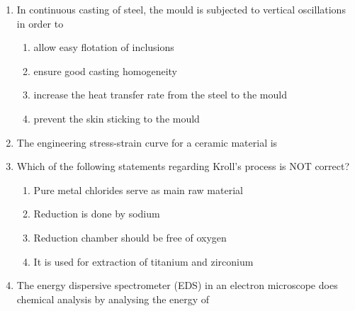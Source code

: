 \documentclass[journal,12pt,onecolumn]{IEEEtran}
\theoremstyle{remark}
\begin{document}
\begin{enumerate}
    

    \item In continuous casting of steel, the mould is subjected to vertical oscillations in order to
    \hfill{}
    \begin{enumerate}[label=(\Alph*)]
        \item allow easy flotation of inclusions
        \item ensure good casting homogeneity
        \item increase the heat transfer rate from the steel to the mould
        \item prevent the skin sticking to the mould
    \end{enumerate}
    


    \item The engineering stress-strain curve for a ceramic material is
    \hfill{}
    \begin{enumerate}[label=(\Alph*)]
    \end{enumerate}
    
    \item Which of the following statements regarding Kroll's process is NOT correct?
    \hfill{}
    \begin{enumerate}[label=(\Alph*)]
        \item Pure metal chlorides serve as main raw material
        \item Reduction is done by sodium
        \item Reduction chamber should be free of oxygen
        \item It is used for extraction of titanium and zirconium
    \end{enumerate}

    \item The energy dispersive spectrometer (EDS) in an electron microscope does chemical analysis by analysing the energy of
    \hfill{}
    \begin{enumerate}[label=(\Alph*)]
    \end{enumerate}


\end{enumerate}
\end{document}
